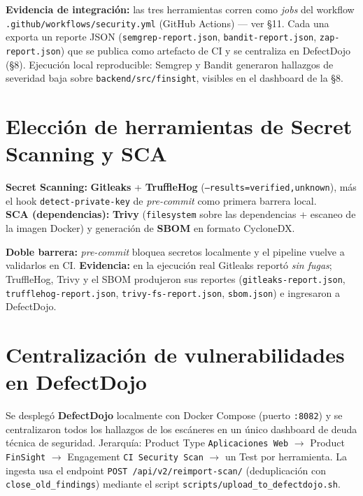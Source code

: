 \documentclass[11pt,a4paper]{article}
\begin{document}
\vspace{3pt}
\noindent\textbf{Evidencia de integración:} las tres herramientas corren como \emph{jobs} del workflow
\texttt{.github/workflows/security.yml} (GitHub Actions) --- ver §11. Cada una exporta un reporte JSON
(\texttt{semgrep-report.json}, \texttt{bandit-report.json}, \texttt{zap-report.json}) que se publica como
artefacto de CI y se centraliza en DefectDojo (§8). Ejecución local reproducible: Semgrep y Bandit generaron
hallazgos de severidad baja sobre \texttt{backend/src/finsight}, visibles en el dashboard de la §8.

\section{Elección de herramientas de Secret Scanning y SCA}
\textbf{Secret Scanning:} \textbf{Gitleaks} + \textbf{TruffleHog} (\texttt{--results=verified,unknown}), más
el hook \texttt{detect-private-key} de \emph{pre-commit} como primera barrera local.\\
\textbf{SCA (dependencias):} \textbf{Trivy} (\texttt{filesystem} sobre las dependencias + escaneo de la
imagen Docker) y generación de \textbf{SBOM} en formato CycloneDX.

\vspace{3pt}
\noindent\textbf{Doble barrera:} \emph{pre-commit} bloquea secretos localmente y el pipeline vuelve a
validarlos en CI. \textbf{Evidencia:} en la ejecución real Gitleaks reportó \emph{sin fugas}; TruffleHog,
Trivy y el SBOM produjeron sus reportes (\texttt{gitleaks-report.json}, \texttt{trufflehog-report.json},
\texttt{trivy-fs-report.json}, \texttt{sbom.json}) e ingresaron a DefectDojo.

\section{Centralización de vulnerabilidades en DefectDojo}
Se desplegó \textbf{DefectDojo} localmente con Docker Compose (puerto \texttt{:8082}) y se centralizaron
todos los hallazgos de los escáneres en un único dashboard de deuda técnica de seguridad. Jerarquía:
Product Type \texttt{Aplicaciones Web} $\rightarrow$ Product \texttt{FinSight} $\rightarrow$ Engagement
\texttt{CI Security Scan} $\rightarrow$ un Test por herramienta. La ingesta usa el endpoint
\texttt{POST /api/v2/reimport-scan/} (deduplicación con \texttt{close\_old\_findings}) mediante el script
\texttt{scripts/upload\_to\_defectdojo.sh}.
\end{document}

